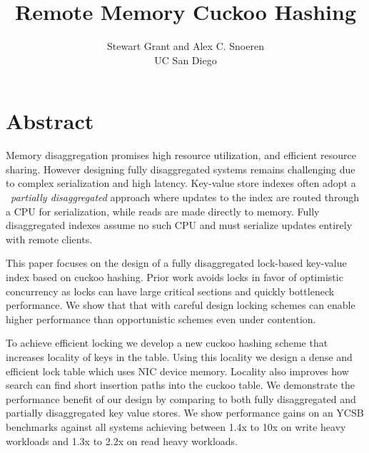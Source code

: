 \documentclass[10pt,twocolumn]{article}
\begin{document}
\title{Remote Memory Cuckoo Hashing}
\author{Stewart Grant and Alex C. Snoeren\\ UC San Diego}
\date{}

\maketitle

\section*{Abstract}

Memory disaggregation promises high resource utilization,
and efficient resource sharing. However designing fully
disaggregated systems remains challenging due to complex
serialization and high latency. Key-value store indexes
often adopt a ~\textit{partially disaggregated} approach
where updates to the index are routed through a CPU for
serialization, while reads are made directly to memory.
Fully disaggregated indexes assume no such CPU and must
serialize updates entirely with remote clients.

This paper focuses on the design of a fully disaggregated
lock-based key-value index based on cuckoo hashing. Prior
work avoids locks in favor of optimistic concurrency as
locks can have large critical sections and quickly
bottleneck performance. We show that that with careful
design locking schemes can enable higher performance than
opportunistic schemes even under contention.

To achieve efficient locking we develop a new cuckoo hashing
scheme that increases locality of keys in the table. Using
this locality we design a dense and efficient lock table which 
uses NIC device memory. Locality also improves how search can
find short insertion paths into the cuckoo table. We 
demonstrate the performance benefit of our design by comparing 
to both fully disaggregated and partially disaggregated key value 
stores. We show performance gains on an YCSB benchmarks 
against all systems achieving between 1.4x to 10x on write heavy 
workloads and 1.3x to 2.2x on read heavy workloads.


\end{document}
